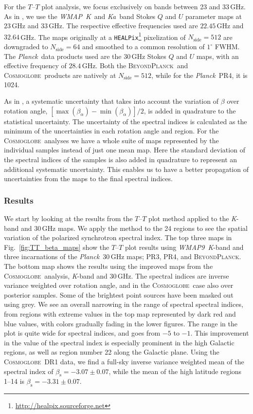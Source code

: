\documentclass[twocolumn]{../../common/aa}
\def\WMAP{\emph{WMAP}}
\def\WMAPnine{\emph{WMAP9}}
\def\Planck{\emph{Planck}}
\def\healpix{\texttt{HEALPix}}
\newcommand{\bp}{\textsc{BeyondPlanck}}
\newcommand{\cosmoglobe}{\textsc{Cosmoglobe}}
\newcommand{\Cosmoglobe}{\textsc{Cosmoglobe}}
\newcommand{\K}[0]{\textit K}
\newcommand{\Ka}[0]{\textit{Ka}}
\begin{document}
For the $T$--$T$ plot  analysis, we focus exclusively on bands between 23 and 33\,GHz. As in \citet{fuskeland2014}, we use the \WMAP\ \K\ and \Ka\ band Stokes $Q$ and $U$ parameter maps at $23$\,GHz and $33$\,GHz. The respective effective frequencies used are $22.45$\,GHz and $32.64$\,GHz. The maps originally at a \healpix\footnote{\url{http://healpix.sourceforge.net}} pixelization of $N_\textrm{side}=512$ are downgraded to $N_\textrm{side}=64$ and smoothed to a common resolution of $1^\circ$ FWHM.
The \Planck\ data products used are the $30$\,GHz Stokes $Q$ and $U$ maps, with an effective frequency of $28.4$\,GHz. Both the \bp\ and \cosmoglobe\ products are natively at $N_\textrm{side}=512$, while for the \Planck\ PR4, it is 1024.





As in \citet{fuskeland:2019}, a systematic uncertainty that takes into account the variation of $\beta$ over rotation angle, $[ \max(\beta_\alpha) - \min(\beta_\alpha) ] /2$, is added in quadrature to the statistical uncertainty.
The uncertainty of the spectral indices is calculated as the minimum of the uncertainties in each rotation angle and region. 
For the \Cosmoglobe\ analyses we have a whole suite of maps represented by the individual samples instead of just one mean map. Here the standard deviation of the spectral indices of the samples is also added in quadrature to represent an additional systematic uncertainty. This enables us to have a better propagation of uncertainties from the maps to the final spectral indices.




\subsubsection{Results}
\label{sec:tt_plot_results}

We start by looking at the results from the $T$--$T$ plot method applied to the \K-band and 30\,GHz maps. We apply the method to the 24 regions to see the spatial variation of the polarized synchrotron spectral index. The top three maps in Fig.~\ref{fig:TT_beta_maps} show the $T$--$T$ plot results using \WMAPnine\ \K-band and three incarnations of the \Planck\ 30\,GHz maps; PR3, PR4, and \bp. The bottom map shows the results using the improved maps from the \cosmoglobe\ analysis, \K-band and 30\,GHz. The spectral indices are inverse variance weighted over rotation angle, and in the \cosmoglobe\ case also over posterior samples. Some of the brightest point sources have been masked out using grey. We see an overall narrowing in the range of spectral spectral indices, from regions with extreme values in the top map represented by dark red and blue values, with colors gradually fading in the lower figures. The range in the plot is quite wide for spectral indices, and goes from $-5$ to $-1$. This improvement in the value of the spectral index is especially prominent in the high Galactic regions, as well as region  number 22 along the Galactic plane.  Using the \cosmoglobe\ DR1 data, we find a full-sky inverse variance weighted mean of the spectral index of $\beta_{\mathrm{s}}=-3.07\pm0.07$, while the mean of the high latitude regions 1--14 is $\beta_{\mathrm{s}}=-3.31\pm0.07$.
\end{document}

